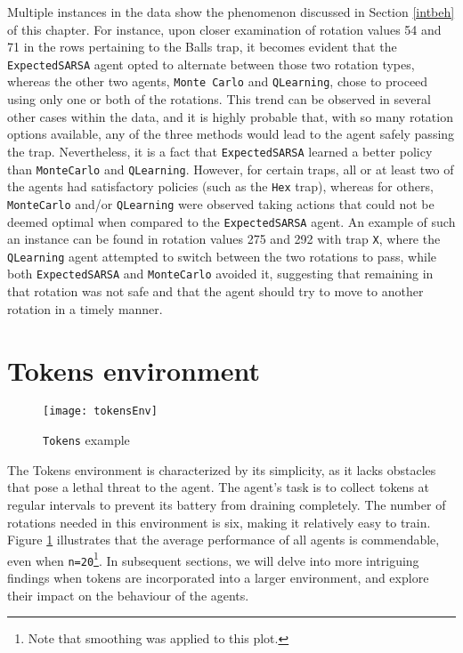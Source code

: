 Multiple instances in the data show the phenomenon discussed in Section \ref{intbeh} of this chapter. For instance, upon closer examination of rotation values 54 and 71 in the rows pertaining to the Balls trap, it becomes evident that the \texttt{ExpectedSARSA} agent opted to alternate between those two rotation types, whereas the other two agents, \texttt{Monte Carlo} and \texttt{QLearning}, chose to proceed using only one or both of the rotations. This trend can be observed in several other cases within the data, and it is highly probable that, with so many rotation options available, any of the three methods would lead to the agent safely passing the trap. Nevertheless, it is a fact that \texttt{ExpectedSARSA} learned a better policy than \texttt{MonteCarlo} and \texttt{QLearning}. However, for certain traps, all or at least two of the agents had satisfactory policies (such as the \texttt{Hex} trap), whereas for others, \texttt{MonteCarlo} and/or \texttt{QLearning} were observed taking actions that could not be deemed optimal when compared to the \texttt{ExpectedSARSA} agent. An example of such an instance can be found in rotation values 275 and 292 with trap \texttt{X}, where the \texttt{QLearning} agent attempted to switch between the two rotations to pass, while both \texttt{ExpectedSARSA} and \texttt{MonteCarlo} avoided it, suggesting that remaining in that rotation was not safe and that the agent should try to move to another rotation in a timely manner.

\section{Tokens environment}
\begin{figure}[h]
    \centering
    \texttt{[image: tokensEnv]}
    \caption{\texttt{Tokens} example}
    \label{fig:tokens}
\end{figure}

The Tokens environment is characterized by its simplicity, as it lacks obstacles that pose a lethal threat to the agent. The agent's task is to collect tokens at regular intervals to prevent its battery from draining completely. The number of rotations needed in this environment is six, making it relatively easy to train. Figure \ref{fig:tokens} illustrates that the average performance of all agents is commendable, even when \texttt{n=20}\footnote{Note that smoothing was applied to this plot.}. In subsequent sections, we will delve into more intriguing findings when tokens are incorporated into a larger environment, and explore their impact on the behaviour of the agents.

